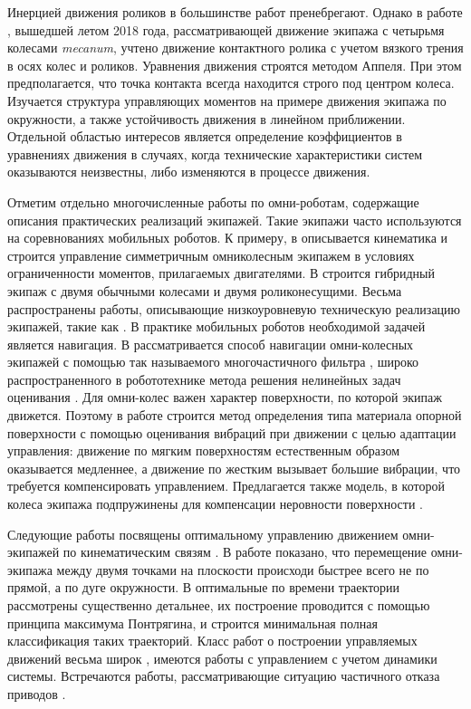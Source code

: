 Инерцией движения роликов в большинстве работ  пренебрегают. Однако в работе \cite{Adamov2018}, вышедшей летом 2018 года, рассматривающей движение экипажа с четырьмя колесами \textit{mecanum}, учтено движение контактного ролика с учетом вязкого трения в осях колес и роликов. Уравнения движения строятся методом Аппеля. При этом предполагается, что точка контакта всегда находится строго под центром колеса. Изучается структура управляющих моментов на примере движения экипажа по окружности, а также устойчивость движения в линейном приближении. Отдельной областью интересов является определение коэффициентов в уравнениях движения \cite{Adamov2018a} в случаях, когда технические характеристики систем оказываются неизвестны, либо изменяются в процессе движения.

Отметим отдельно многочисленные работы по омни-роботам, содержащие описания практических реализаций  экипажей. Такие экипажи часто используются на соревнованиях мобильных роботов. К примеру, в \cite{Indiveri2007} описывается кинематика и строится управление симметричным омниколесным экипажем в условиях ограниченности моментов, прилагаемых двигателями. В \cite{Wada2007} строится гибридный экипаж с двумя обычными колесами и двумя роликонесущими. Весьма распространены работы, описывающие  низкоуровневую техническую реализацию экипажей, такие как \cite{Mohamed2017,Krishnaraj2017,SalamAl-Ammri2010}. В практике мобильных роботов необходимой задачей является навигация. В \cite{Eng2010} рассматривается способ навигации омни-колесных экипажей с помощью так называемого многочастичного фильтра \cite{Gordon1993}, широко распространенного в робототехнике метода решения нелинейных задач оценивания \cite{DelMoral1997}. Для омни-колес важен характер поверхности, по которой экипаж движется. Поэтому в работе \cite{Vicente2015} строится метод определения типа материала опорной поверхности с помощью оценивания вибраций при движении с целью адаптации управления: движение по мягким поверхностям естественным образом оказывается медленнее, а движение по жестким вызывает б\textit{о}льшие вибрации, что требуется компенсировать управлением. Предлагается также модель, в которой колеса экипажа подпружинены для компенсации неровности поверхности \cite{NguenMAI2012}.

Следующие работы посвящены оптимальному управлению движением омни-экипажей
по кинематическим связям
.
В работе \cite{Ashmore2002a} показано, что перемещение омни-экипажа между двумя точками на плоскости происходи быстрее всего не по прямой, а по дуге окружности. В \cite{Balkcom2006} оптимальные по времени траектории рассмотрены существенно детальнее, их построение проводится с помощью принципа максимума Понтрягина, и строится минимальная полная классификация таких траекторий. Класс работ о построении управляемых движений весьма широк \cite{Huang2015,Bramanta2017,Kalmar-Nagy2016,Szayer2017}, имеются работы с управлением с учетом динамики системы. Встречаются работы, рассматривающие ситуацию частичного отказа приводов \cite{Field2017,Ivanov2015a}.

